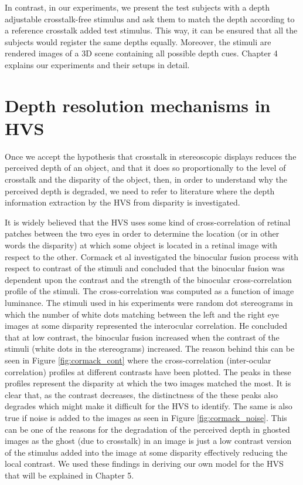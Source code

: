 In contrast, in our experiments, we present the test subjects with a depth adjustable crosstalk-free stimulus and ask them to match the depth according to a reference crosstalk added test stimulus. This way, it can be ensured that all the subjects would register the same depths equally. Moreover, the stimuli are rendered images of a 3D scene containing all possible depth cues. Chapter 4 explains our experiments and their setups in detail.

\section{Depth resolution mechanisms in HVS}
Once we accept the hypothesis that crosstalk in stereoscopic displays reduces the perceived depth of an object, and that it does so proportionally to the level of crosstalk and the disparity of the object, then, in order to understand why the perceived depth is degraded, we need to refer to literature where the depth information extraction by the HVS from disparity is investigated.

It is widely believed that the HVS uses some kind of cross-correlation of retinal patches between the two eyes in order to determine the location (or in other words the disparity) at which some object is located in a retinal image with respect to the other. Cormack et al\cite{cormack1991interocular} investigated the binocular fusion process with respect to contrast of the stimuli and concluded that the binocular fusion was dependent upon the contrast and the strength of the binocular cross-correlation profile of the stimuli. The cross-correlation was computed as a function of image luminance. The stimuli used in his experiments were random dot stereograms in which the number of white dots matching between the left and the right eye images at some disparity represented the interocular correlation. He concluded that at low contrast, the binocular fusion increased when the contrast of the stimuli (white dots in the stereograms) increased. The reason behind this can be seen in Figure \ref{fig:cormack_cont} where the cross-correlation (inter-ocular correlation) profiles at different contrasts have been plotted. The peaks in these profiles represent the disparity at which the two images matched the most. It is clear that, as the contrast decreases, the distinctness of the these peaks also degrades which might make it difficult for the HVS to identify. The same is also true if noise is added to the images as seen in Figure \ref{fig:cormack_noise}. This can be one of the reasons for the degradation of the perceived depth in ghosted images as the ghost (due to crosstalk) in an image is just a low contrast version of the stimulus added into the image at some disparity effectively reducing the local contrast. We used these findings in deriving our own model for the HVS that will be explained in Chapter 5.


